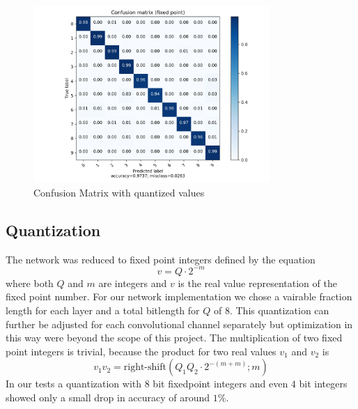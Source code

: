 \begin{figure}[htbp]
	\centering
	\includegraphics[width=0.8\textwidth]{../../net/images/qcm}
	\caption{Confusion Matrix with quantized values}
	\label{fig:network-test-qcm}
\end{figure}

\subsection{Quantization}

The network was reduced to fixed point integers defined by the equation
\begin{equation}
	v = Q \cdot 2 ^{-m}
\end{equation}
where both $Q$ and $m$ are integers and $v$ is the real value representation of the fixed point number. 
For our network implementation we chose a vairable fraction length for each layer and a total bitlength for $Q$ of $8$. 
This quantization can further be adjusted for each convolutional channel separately but optimization in this way were beyond the scope of this project.
The multiplication of two fixed point integers is trivial, because the product for two real values $v_1$ and $v_2$ is 
\begin{equation}
	v_1 v_2 = \text{right-shift}\left( Q_1 Q_2 \cdot 2^{-(m+m)} ; m\right)
\end{equation}
In our tests a quantization with $8$ bit fixedpoint integers and even $4$ bit integers showed only a small drop in accuracy of around $1 \%$.


